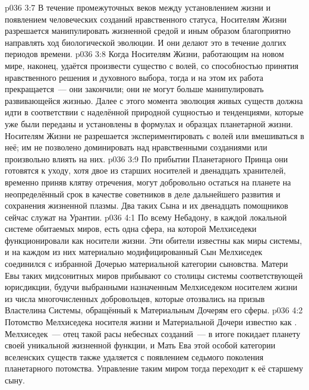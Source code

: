 \vs p036 3:7 В течение промежуточных веков между установлением жизни и появлением человеческих созданий нравственного статуса, Носителям Жизни разрешается манипулировать жизненной средой и иным образом благоприятно направлять ход биологической эволюции. И они делают это в течение долгих периодов времени.
\vs p036 3:8 Когда Носителям Жизни, работающим на новом мире, наконец, удаётся произвести существо с волей, со способностью принятия нравственного решения и духовного выбора, тогда и на этом их работа прекращается~--- они закончили; они не могут больше манипулировать развивающейся жизнью. Далее с этого момента эволюция живых существ должна идти в соответствии с наделённой природной сущностью и тенденциями, которые уже были переданы и установлены в формулах и образцах планетарной жизни. Носителям Жизни не разрешается экспериментировать с волей или вмешиваться в неё; им не позволено доминировать над нравственными созданиями или произвольно влиять на них.
\vs p036 3:9 По прибытии Планетарного Принца они готовятся к уходу, хотя двое из старших носителей и двенадцать хранителей, временно приняв клятву отречения, могут добровольно остаться на планете на неопределённый срок в качестве советников в деле дальнейшего развития и сохранения жизненной плазмы. Два таких Сына и их двенадцать помощников сейчас служат на Урантии.
\vs p036 4:1 По всему Небадону, в каждой локальной системе обитаемых миров, есть одна сфера, на которой Мелхиседеки функционировали как носители жизни. Эти обители известны как  миры системы, и на каждом из них материально модифицированный Сын Мелхиседек соединился с избранной Дочерью материальной категории сыновства. Матери Евы таких мидсонитных миров прибывают со столицы системы соответствующей юрисдикции, будучи выбранными назначенным Мелхиседеком носителем жизни из числа многочисленных добровольцев, которые отозвались на призыв Властелина Системы, обращённый к Материальным Дочерям его сферы.
\vs p036 4:2 Потомство Мелхиседека носителя жизни и Материальной Дочери известно как . Мелхиседек~--- отец такой расы небесных созданий~--- в итоге покидает планету своей уникальной жизненной функции, и Мать Ева этой особой категории вселенских существ также удаляется с появлением седьмого поколения планетарного потомства. Управление таким миром тогда переходит к её старшему сыну.
